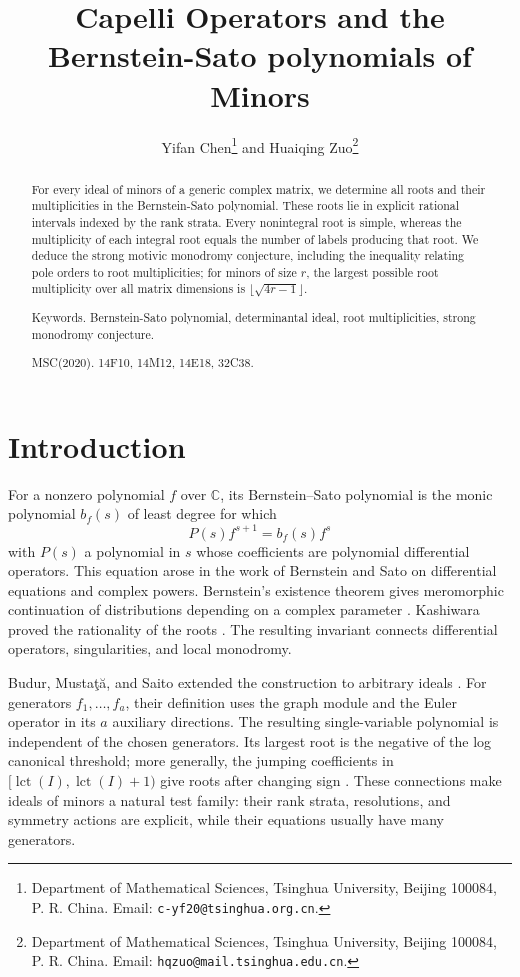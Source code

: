 \documentclass[11pt,a4paper]{article}
\title{Capelli Operators and the Bernstein-Sato polynomials of Minors}
\author{
  Yifan Chen\thanks{
    Department of Mathematical Sciences,
    Tsinghua University,
    Beijing 100084, P. R. China.
    Email: \texttt{c-yf20@tsinghua.org.cn}.
  }
  and
  Huaiqing Zuo\thanks{
    Department of Mathematical Sciences,
    Tsinghua University,
    Beijing 100084, P. R. China.
    Email: \texttt{hqzuo@mail.tsinghua.edu.cn}.
  }
}
\date{}
\numberwithin{equation}{section}
\theoremstyle{definition}
\newcommand{\C}{\mathbb C}
\begin{document}
\maketitle
\begin{abstract}
For every ideal of minors of a generic complex matrix, we determine all roots and their multiplicities in the Bernstein-Sato polynomial. These roots lie in explicit rational intervals indexed by the rank strata. Every nonintegral root is simple, whereas the multiplicity of each integral root equals the number of labels producing that root. We deduce the strong motivic monodromy conjecture, including the inequality relating pole orders to root multiplicities; for minors of size $r$, the largest possible root multiplicity over all matrix dimensions is $\lfloor\sqrt{4r-1}\rfloor$.
	
Keywords. Bernstein-Sato polynomial, determinantal ideal, root multiplicities, strong monodromy conjecture.

MSC(2020). 14F10, 14M12, 14E18, 32C38.
\end{abstract}

\begingroup
\small
\tableofcontents
\endgroup

\section{Introduction}\label{sec:introduction}

For a nonzero polynomial $f$ over $\C$, its Bernstein--Sato polynomial
is the monic polynomial $b_f(s)$ of least degree for which
\[
P(s)f^{s+1}=b_f(s)f^s
\]
with $P(s)$ a polynomial in $s$ whose coefficients are polynomial
differential operators. This equation arose in the work of Bernstein
and Sato on differential equations and complex powers. Bernstein's
existence theorem gives meromorphic continuation of distributions
depending on a complex parameter \cite{Bernstein}. Kashiwara proved
the rationality of the roots \cite{Kashiwara}. The resulting invariant
connects differential operators, singularities, and local monodromy.

Budur, Musta\c t\u a, and Saito extended the construction to arbitrary
ideals \cite{BMS}. For generators $f_1,\ldots,f_a$, their definition
uses the graph module and the Euler operator in its $a$ auxiliary
directions. The resulting single-variable polynomial is independent
of the chosen generators. Its largest root is the negative of the
log canonical threshold; more generally, the jumping coefficients in
$[\operatorname{lct}(I),\operatorname{lct}(I)+1)$ give roots after changing sign
\cite[Theorem~2]{BMS}. These
connections make ideals of minors a natural test family: their
rank strata, resolutions, and symmetry actions are explicit, while
their equations usually have many generators.
\end{document}
